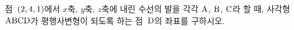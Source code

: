 점~$(2{,}\mkern3mu\mathopen{}4{,}\mkern3mu\mathopen{}1)$에서 $x$축, $y$축, $z$축에 내린 수선의 발을 각각 $\mathrm{A}$, $\mathrm{B}$, $\mathrm{C}$라 할 때, 사각형~$\mathrm{ABCD}$가 평행사변형이 되도록 하는 점~$\mathrm{D}$의 좌표를 구하시오.
